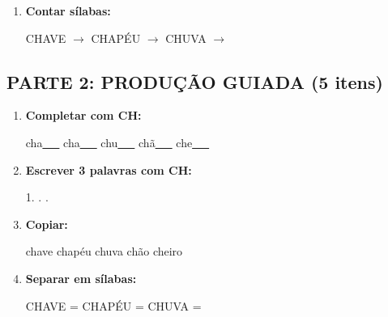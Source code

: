 \begin{exercicio}
\begin{enumerate}
  \item \textbf{Contar sílabas:}
  \begin{center}
  CHAVE $\rightarrow$ \underline{\hspace{0.9cm}} \quad CHAPÉU $\rightarrow$ \underline{\hspace{0.9cm}} \quad CHUVA $\rightarrow$ \underline{\hspace{0.9cm}}
  \end{center}

\end{enumerate}

\subsection*{PARTE 2: PRODUÇÃO GUIADA (5 itens)}

\begin{enumerate}[resume]

  \item \textbf{Completar com CH:}
  \begin{center}
  cha\underline{~~~} \quad cha\underline{~~~} \quad chu\underline{~~~} \quad chã\underline{~~~} \quad che\underline{~~~}
  \end{center}

  \item \textbf{Escrever 3 palavras com CH:}
  \begin{center}
  1. \underline{\hspace{3cm}} . \underline{\hspace{3cm}} . \underline{\hspace{3cm}}
  \end{center}

  \item \textbf{Copiar:}
  \begin{center}
  chave \quad chapéu \quad chuva \quad chão \quad cheiro
  \end{center}

  \item \textbf{Separar em sílabas:}
  \begin{center}
  CHAVE = \underline{\hspace{1cm}} \underline{\hspace{1cm}} \quad CHAPÉU = \underline{\hspace{1cm}} \underline{\hspace{1cm}} \quad CHUVA = \underline{\hspace{1cm}} \underline{\hspace{1cm}}
  \end{center}


\end{enumerate}
\end{exercicio}
